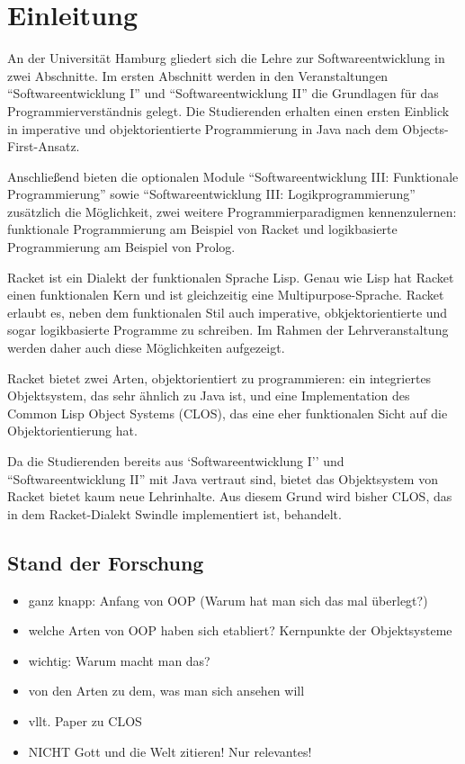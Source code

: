 \chapter{Einleitung} %
An der Universität Hamburg gliedert sich die Lehre zur Softwareentwicklung in zwei Abschnitte. Im ersten Abschnitt werden in den Veranstaltungen ``Softwareentwicklung I'' und ``Softwareentwicklung II'' die Grundlagen für das Programmierverständnis gelegt. Die Studierenden erhalten einen ersten Einblick in imperative und objektorientierte Programmierung in Java nach dem Objects-First-Ansatz.

Anschließend bieten die optionalen Module ``Softwareentwicklung III: Funktionale Programmierung'' sowie ``Softwareentwicklung III: Logikprogrammierung'' zusätzlich die Möglichkeit, zwei weitere  Programmierparadigmen kennenzulernen: funktionale Programmierung am Beispiel von Racket und logikbasierte Programmierung am Beispiel von Prolog.

Racket ist ein Dialekt der funktionalen Sprache Lisp. Genau wie Lisp hat Racket einen funktionalen Kern und ist gleichzeitig eine Mul\-ti\-pur\-pose-Spra\-che. Racket erlaubt es, neben dem funktionalen Stil auch imperative, obkjektorientierte und sogar logikbasierte Programme zu schreiben. Im Rahmen der Lehrveranstaltung werden daher auch diese Möglichkeiten aufgezeigt. 

Racket bietet zwei Arten, objektorientiert zu programmieren: ein integriertes Objektsystem, das sehr ähnlich zu Java ist, und eine Implementation des Common Lisp Object Systems (CLOS), das eine eher funktionalen Sicht auf die Objektorientierung hat. 

Da die Studierenden bereits aus `Softwareentwicklung I'' und ``Softwareentwicklung II'' mit Java vertraut sind, bietet das Objektsystem von Racket bietet kaum neue Lehrinhalte. Aus diesem Grund wird bisher CLOS, das in dem Racket-Dialekt Swindle implementiert ist, behandelt. 

\section{Stand der Forschung} 
\begin{itemize}
 \item ganz knapp: Anfang von OOP (Warum hat man sich das mal überlegt?)
 \item welche Arten von OOP haben sich etabliert? Kernpunkte der Objektsysteme
 \item wichtig: Warum macht man das?
 \item von den Arten zu dem, was man sich ansehen will
 \item vllt. Paper zu CLOS
 \item NICHT Gott und die Welt zitieren! Nur relevantes!
\end{itemize}

